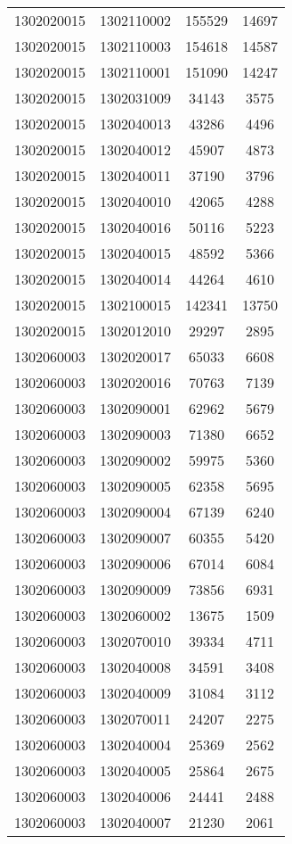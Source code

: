 \begin{longtable}[h]{llcc}
		1302020015 & 1302110002 & 155529 & 14697\\
		1302020015 & 1302110003 & 154618 & 14587\\
		1302020015 & 1302110001 & 151090 & 14247\\
		1302020015 & 1302031009 & 34143 & 3575\\
		1302020015 & 1302040013 & 43286 & 4496\\
		1302020015 & 1302040012 & 45907 & 4873\\
		1302020015 & 1302040011 & 37190 & 3796\\
		1302020015 & 1302040010 & 42065 & 4288\\
		1302020015 & 1302040016 & 50116 & 5223\\
		1302020015 & 1302040015 & 48592 & 5366\\
		1302020015 & 1302040014 & 44264 & 4610\\
		1302020015 & 1302100015 & 142341 & 13750\\
		1302020015 & 1302012010 & 29297 & 2895\\
		1302060003 & 1302020017 & 65033 & 6608\\
		1302060003 & 1302020016 & 70763 & 7139\\
		1302060003 & 1302090001 & 62962 & 5679\\
		1302060003 & 1302090003 & 71380 & 6652\\
		1302060003 & 1302090002 & 59975 & 5360\\
		1302060003 & 1302090005 & 62358 & 5695\\
		1302060003 & 1302090004 & 67139 & 6240\\
		1302060003 & 1302090007 & 60355 & 5420\\
		1302060003 & 1302090006 & 67014 & 6084\\
		1302060003 & 1302090009 & 73856 & 6931\\
		1302060003 & 1302060002 & 13675 & 1509\\
		1302060003 & 1302070010 & 39334 & 4711\\
		1302060003 & 1302040008 & 34591 & 3408\\
		1302060003 & 1302040009 & 31084 & 3112\\
		1302060003 & 1302070011 & 24207 & 2275\\
		1302060003 & 1302040004 & 25369 & 2562\\
		1302060003 & 1302040005 & 25864 & 2675\\
		1302060003 & 1302040006 & 24441 & 2488\\
		1302060003 & 1302040007 & 21230 & 2061\\

\end{longtable}
